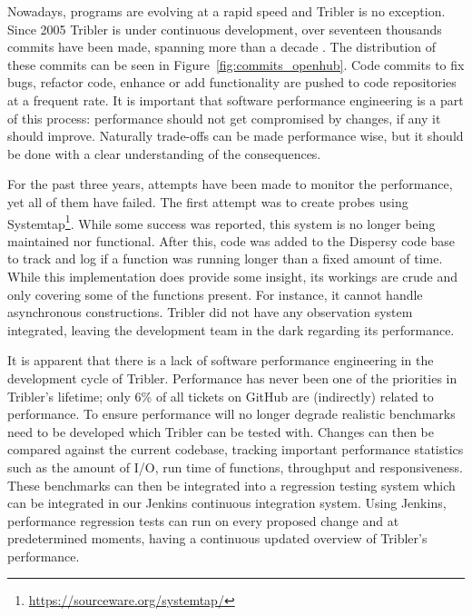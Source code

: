 Nowadays, programs are evolving at a rapid speed and Tribler is no exception. 
Since 2005 Tribler is under continuous development, over seventeen thousands commits have been made, spanning more than a decade \cite{openhub2016tribler}.
The distribution of these commits can be seen in Figure~\ref{fig:commits_openhub}.
Code commits to fix bugs, refactor code, enhance or add functionality are pushed to code repositories at a frequent rate.
It is important that software performance engineering is a part of this process: performance should not get compromised by changes, if any it should improve.
Naturally trade-offs can be made performance wise, but it should be done with a clear understanding of the consequences.

For the past three years, attempts have been made to monitor the performance, yet all of them have failed.
The first attempt was to create probes using Systemtap\footnote{\url{https://sourceware.org/systemtap/}}.
While some success was reported, this system is no longer being maintained nor functional.
After this, code was added to the Dispersy code base to track and log if a function was running longer than a fixed amount of time.
While this implementation does provide some insight, its workings are crude and only covering some of the functions present.
For instance, it cannot handle asynchronous constructions.
Tribler did not have any observation system integrated, leaving the development team in the dark regarding its performance.

It is apparent that there is a lack of software performance engineering in the development cycle of Tribler.
Performance has never been one of the priorities in Tribler's lifetime; only 6\% of all tickets on GitHub are (indirectly) related to performance.
To ensure performance will no longer degrade realistic benchmarks need to be developed which Tribler can be tested with.
Changes can then be compared against the current codebase, tracking important performance statistics such as the amount of I/O, run time of functions, throughput and responsiveness.
These benchmarks can then be integrated into a regression testing system which can be integrated in our Jenkins continuous integration system.
Using Jenkins, performance regression tests can run on every proposed change and at predetermined moments, having a continuous updated overview of Tribler's performance.


